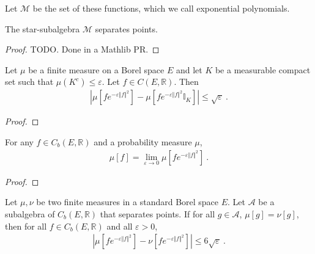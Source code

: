 Let $\mathcal M$ be the set of these functions, which we call exponential polynomials.

\begin{lemma}\label{lem:separates_points_expPoly}
\mathlibok
{}
The star-subalgebra $\mathcal M$ separates points.
\end{lemma}

\begin{proof}
TODO. Done in a Mathlib PR.
\end{proof}


\begin{lemma}\label{lem:integral_restrict_compact}
\mathlibok
{}
Let $\mu$ be a finite measure on a Borel space $E$ and let $K$ be a measurable compact set such that $\mu(K^c) \le \varepsilon$. Let $f \in C(E, \mathbb{R})$. Then
\begin{align*}
\left\vert \mu[fe^{-\varepsilon \Vert f \Vert^2}] - \mu[f e^{-\varepsilon \Vert f \Vert^2} \mathbb{I}_K] \right\vert
\le \sqrt{\varepsilon} \: .
\end{align*}
\end{lemma}

\begin{proof}\leanok
\end{proof}


\begin{lemma}\label{lem:introduce_exponential}
\mathlibok
{}
For any $f \in C_b(E, \mathbb{R})$ and a probability measure $\mu$,
\begin{align*}
\mu[f] 
= \lim_{\varepsilon \to 0} \mu\left[f e^{-\varepsilon \Vert f \Vert^2} \right]
\: .
\end{align*}
\end{lemma}

\begin{proof}\leanok
\end{proof}


\begin{lemma}\label{lem:dist_integral_mulExpNegMulSq_comp_le}
\mathlibok
{}
Let $\mu, \nu$ be two finite measures in a standard Borel space $E$. Let $\mathcal{A}$ be a subalgebra of $C_b(E, \mathbb{R})$ that separates points.
If for all $g \in \mathcal A$, $\mu[g] = \nu[g]$, then for all $f \in C_b(E, \mathbb{R})$ and all $\varepsilon > 0$,
\begin{align*}
    \left\vert \mu[fe^{-\varepsilon \Vert f \Vert^2}] - \nu[f e^{-\varepsilon \Vert f \Vert^2}] \right\vert
    \le 6\sqrt{\varepsilon} \: .
\end{align*}
\end{lemma}

